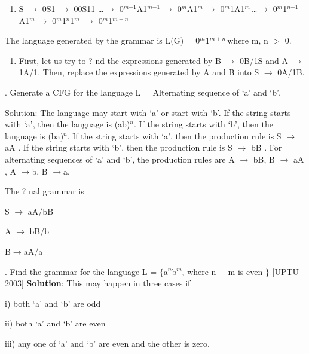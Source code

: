 \documentclass{article} %
\begin{document}
\begin{enumerate}
\item  S $\mathrm{\to}$ 0S1 $\mathrm{\to}$ 00S11 {\dots}$\mathrm{\to}$ 0${}^{m\mathrm{-}1}$A1${}^{m\mathrm{-}1\ }$$\mathrm{\to}$ 0${}^{m}$A1${}^{m\ }$$\mathrm{\to}$ 0${}^{m}$1A1${}^{m\ }${\dots}$\mathrm{\to}$ 0${}^{m}$1${}^{n\mathrm{-}1}$A1${}^{m\ }$$\mathrm{\to}$ 0${}^{m}$1${}^{n}$1${}^{m}$ $\mathrm{\to}$ 0${}^{m}$1${}^{m+n\ }$
\end{enumerate}

\noindent The language generated by the grammar is L(G) = 0${}^{m}$1${}^{m+n\ }$where m, n $\mathrm{>}$ 0.

\begin{enumerate}
\item  First, let us try to ? nd the expressions generated by B $\mathrm{\to}$ 0B/1S and A $\mathrm{\to}$ 1A/1. Then, replace the expressions generated by A and B into S $\mathrm{\to}$ 0A/1B.
\end{enumerate}

. Generate a CFG for the language L = Alternating sequence of `a' and `b'.

\noindent Solution: The language may start with `a' or start with `b'. If the string starts with `a', then the language is (ab)${}^{n}$. If the string starts with `b', then the language is (ba)${}^{n}$. If the string starts with `a', then the production rule is S $\mathrm{\to}$ aA . If the string starts with `b', then the production rule is S $\mathrm{\to}$ bB . For alternating sequences of `a' and `b', the production rules are A $\mathrm{\to}$ bB, B $\mathrm{\to}$ aA , A $\mathrm{\to}$b, B $\mathrm{\to}$a.

\noindent The ? nal grammar is

\noindent S $\mathrm{\to}$ aA/bB

\noindent A $\mathrm{\to}$ bB/b

\noindent B$\mathrm{\to}$aA/a

. Find the grammar for the language L = $\mathrm{\{}$a${}^{n}$b${}^{m}$, where n + m is even $\mathrm{\}}$                    [UPTU 2003] \textbf{Solution}: This may happen in three cases if

\noindent   i) both `a' and `b' are odd

\noindent ii) both `a' and `b' are even

\noindent  iii) any one of `a' and `b' are even and the other is zero.

\noindent 
\end{document}
